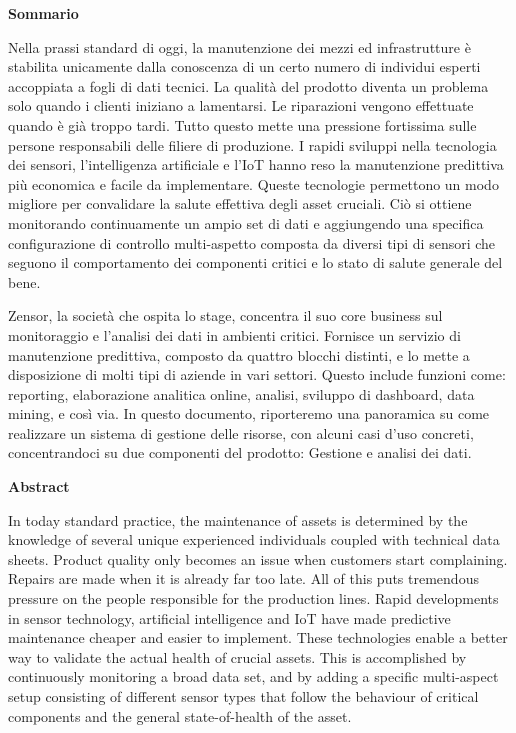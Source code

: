 \begin{center}
    \textbf{Sommario}
\end{center}
Nella prassi standard di oggi, la manutenzione dei mezzi ed infrastrutture è stabilita unicamente dalla conoscenza di un certo numero di individui esperti accoppiata a fogli di dati tecnici.
La qualità del prodotto diventa un problema solo quando i clienti iniziano a lamentarsi. Le riparazioni vengono effettuate quando è già troppo tardi. Tutto questo mette una pressione fortissima sulle persone responsabili delle filiere di produzione. 
I rapidi sviluppi nella tecnologia dei sensori, l'intelligenza artificiale e l'\acl{IoT} hanno reso la manutenzione predittiva più economica e facile da implementare. Queste tecnologie permettono un modo migliore per convalidare la salute effettiva degli asset cruciali. 
Ciò si ottiene monitorando continuamente un ampio set di dati e aggiungendo una specifica configurazione di controllo multi-aspetto composta da diversi tipi di sensori che seguono il comportamento dei componenti critici e lo stato di salute generale del bene.

Zensor, la società che ospita lo stage, concentra il suo core business sul monitoraggio e l'analisi dei dati in ambienti critici. Fornisce un servizio di manutenzione predittiva, composto da quattro blocchi distinti, e lo mette a disposizione di molti tipi di aziende in vari settori. 
Questo include funzioni come: reporting, elaborazione analitica online, analisi, sviluppo di dashboard, data mining, e così via.
In questo documento, riporteremo una panoramica su come realizzare un sistema di gestione delle risorse, con alcuni casi d'uso concreti, concentrandoci su due componenti del prodotto: Gestione e analisi dei dati.
\cleardoublepage

\begin{center}
    \textbf{Abstract}
\end{center}

In today standard practice, the maintenance of assets is determined by the knowledge of several unique experienced individuals coupled with technical data sheets.
Product quality only becomes an issue when customers start complaining. Repairs are made when it is already far too late. All of this puts tremendous pressure on the people responsible for the production lines. 
Rapid developments in sensor technology, artificial intelligence and \acl{IoT} have made predictive maintenance cheaper and easier to implement. These technologies enable a better way to validate the actual health of crucial assets. 
This is accomplished by continuously monitoring a broad data set, and by adding a specific multi-aspect setup consisting of different sensor types that follow the behaviour of critical components and the general state-of-health of the asset.

